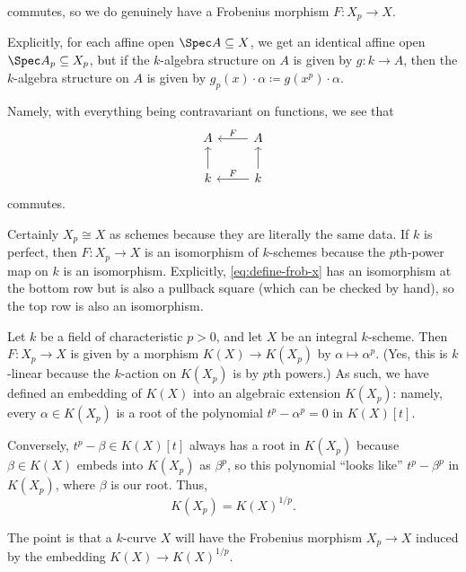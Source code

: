 \documentclass[../notes.tex]{subfiles}
\begin{document}
commutes, so we do genuinely have a Frobenius morphism $F\colon X_p\to X$.
\begin{remark}
	Explicitly, for each affine open $\Spec A\subseteq X$, we get an identical affine open $\Spec A_p\subseteq X_p$, but if the $k$-algebra structure on $A$ is given by $g\colon k\to A$, then the $k$-algebra structure on $A$ is given by $g_p(x)\cdot\alpha\coloneqq g\left(x^p\right)\cdot\alpha$.
\end{remark}
Namely, with everything being contravariant on functions, we see that
\[\begin{tikzcd}
	A & A \\
	k & k
	\arrow["F"', from=2-2, to=2-1]
	\arrow["F"', from=1-2, to=1-1]
	\arrow[from=2-2, to=1-2]
	\arrow[from=2-1, to=1-1]
\end{tikzcd}\]
commutes.
\begin{remark}
	Certainly $X_p\cong X$ as schemes because they are literally the same data. If $k$ is perfect, then $F\colon X_p\to X$ is an isomorphism of $k$-schemes because the $p$th-power map on $k$ is an isomorphism. Explicitly, \eqref{eq:define-frob-x} has an isomorphism at the bottom row but is also a pullback square (which can be checked by hand), so the top row is also an isomorphism.
\end{remark}
\begin{example}
	Let $k$ be a field of characteristic $p>0$, and let $X$ be an integral $k$-scheme. Then $F\colon X_p\to X$ is given by a morphism $K(X)\to K(X_p)$ by $\alpha\mapsto\alpha^p$. (Yes, this is $k$-linear because the $k$-action on $K(X_p)$ is by $p$th powers.) As such, we have defined an embedding of $K(X)$ into an algebraic extension $K(X_p)$: namely, every $\alpha\in K(X_p)$ is a root of the polynomial $t^p-\alpha^p=0$ in $K(X)[t]$.
	
	Conversely, $t^p-\beta\in K(X)[t]$ always has a root in $K(X_p)$ because $\beta\in K(X)$ embeds into $K(X_p)$ as $\beta^p$, so this polynomial ``looks like'' $t^p-\beta^p$ in $K(X_p)$, where $\beta$ is our root. Thus,
	\[K(X_p)=K(X)^{1/p}.\]
\end{example}
The point is that a $k$-curve $X$ will have the Frobenius morphism $X_p\to X$ induced by the embedding $K(X)\to K(X)^{1/p}$.
\end{document}
